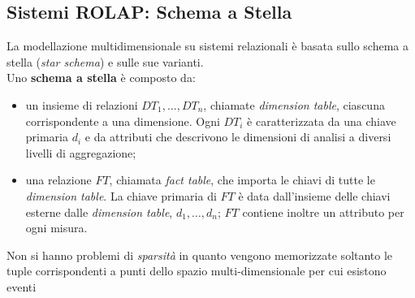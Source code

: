 \documentclass[a4paper, notitlepage, 9pt]{extreport}
\begin{document}
\subsection*{Sistemi ROLAP: Schema a Stella}
La modellazione multidimensionale su sistemi relazionali è basata sullo schema a stella (\textit{star schema}) e sulle sue varianti.\\
Uno \textbf{schema a stella} è composto da:
\begin{itemize}
	\item un insieme di relazioni $DT_1, \dots , DT_n$, chiamate \textit{dimension table}, ciascuna corrispondente a una dimensione. Ogni $DT_i$ è caratterizzata da una chiave primaria $d_i$ e da attributi che descrivono le dimensioni di analisi a diversi livelli di aggregazione;
	\item una relazione $FT$, chiamata \textit{fact table}, che importa le chiavi di tutte le \textit{dimension table}. La chiave primaria di $FT$ è data dall’insieme delle chiavi esterne dalle \textit{dimension table}, $d_1, \dots , d_n$; $FT$ contiene inoltre un attributo per ogni misura.
\end{itemize}
Non si hanno problemi di \textit{sparsità} in quanto vengono memorizzate soltanto le tuple corrispondenti a punti dello spazio multi-dimensionale per cui esistono eventi
\end{document}
